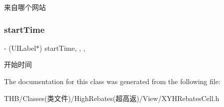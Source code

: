 来自哪个网站 \mbox{\label{interface_x_y_h_rebates_cell_ae144a3ace5765c966210fea8831a446b}} 
\subsubsection{\texorpdfstring{start\+Time}{startTime}}
{\footnotesize\ttfamily -\/ (U\+I\+Label$\ast$) start\+Time\hspace{0.3cm}{\ttfamily [read]}, {\ttfamily [write]}, {\ttfamily [nonatomic]}, {\ttfamily [strong]}}

开始时间 

The documentation for this class was generated from the following file\+:\begin{DoxyCompactItemize}
\item 
T\+H\+B/\+Classes(类文件)/\+High\+Rebates(超高返)/\+View/X\+Y\+H\+Rebates\+Cell.\+h\end{DoxyCompactItemize}
